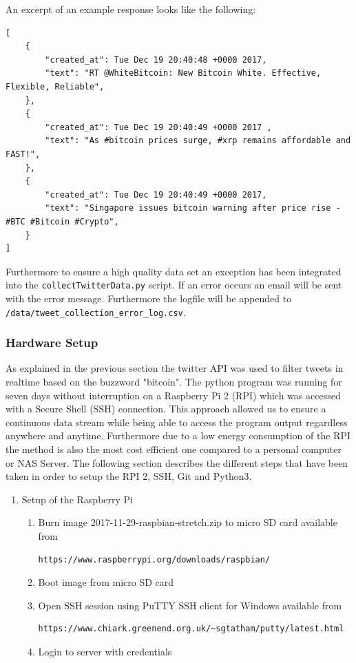 \documentclass[a4paper,12pt]{article}
\begin{document}
\begin{spacing}{1.2}
An excerpt of an example response looks like the following:
\begin{lstlisting}
[
    {
        "created_at": Tue Dec 19 20:40:48 +0000 2017, 
        "text": "RT @WhiteBitcoin: New Bitcoin White. Effective, Flexible, Reliable", 
    }, 
    {
        "created_at": Tue Dec 19 20:40:49 +0000 2017 ,
        "text": "As #bitcoin prices surge, #xrp remains affordable and FAST!",
    }, 
    {
        "created_at": Tue Dec 19 20:40:49 +0000 2017, 
        "text": "Singapore issues bitcoin warning after price rise - #BTC #Bitcoin #Crypto", 
    }
]
\end{lstlisting}

Furthermore to ensure a high quality data set an exception has been integrated into the \verb|collectTwitterData.py| script. If an error occurs an email will be sent with the error message. Furthermore the logfile will be  appended to \verb|/data/tweet_collection_error_log.csv|.

\subsubsection{Hardware Setup}
As explained in the previous section the twitter API was used to filter tweets in realtime based on the buzzword "bitcoin". The python program was running for seven days without interruption on a Raspberry Pi 2 (RPI) which was accessed with a Secure Shell (SSH) connection. This approach allowed us to ensure a continuous data stream while being able to access the program output regardless anywhere and anytime. Furthermore due to a low energy consumption of the RPI the method is also the most cost efficient one compared to a personal computer or NAS Server. The following section describes the different steps that have been taken in order to setup the RPI 2, SSH, Git and Python3.\newline 

\begin{enumerate}
\item Setup of the Raspberry Pi
\begin{enumerate}
\item Burn image 2017-11-29-raspbian-stretch.zip to micro SD card available from
\begin{lstlisting}[language=bash]
https://www.raspberrypi.org/downloads/raspbian/
\end{lstlisting}
\item Boot image from micro SD card 
\item Open SSH session using PuTTY SSH client for Windows available from
\begin{lstlisting}[language=bash] 
https://www.chiark.greenend.org.uk/~sgtatham/putty/latest.html
\end{lstlisting}
\item Login to server with credentials 
\end{enumerate}


\end{enumerate}
\end{spacing}
\end{document}
